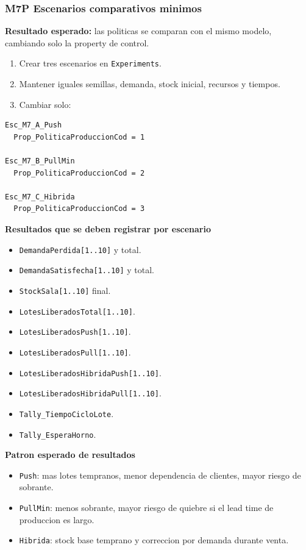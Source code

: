 \documentclass[11pt]{article}
\newcommand{\simio}[1]{\texttt{#1}}
\newcommand{\state}[1]{\texttt{#1}}
\begin{document}
\subsubsection{M7P Escenarios comparativos minimos}
\textbf{Resultado esperado:} las politicas se comparan con el mismo modelo, cambiando solo la property de control.

\begin{enumerate}
  \item Crear tres escenarios en \simio{Experiments}.
  \item Mantener iguales semillas, demanda, stock inicial, recursos y tiempos.
  \item Cambiar solo:
\end{enumerate}

\begin{lstlisting}[caption={Controles de escenarios M7}]
Esc_M7_A_Push
  Prop_PoliticaProduccionCod = 1

Esc_M7_B_PullMin
  Prop_PoliticaProduccionCod = 2

Esc_M7_C_Hibrida
  Prop_PoliticaProduccionCod = 3
\end{lstlisting}

\textbf{Resultados que se deben registrar por escenario}
\begin{itemize}
  \item \state{DemandaPerdida[1..10]} y total.
  \item \state{DemandaSatisfecha[1..10]} y total.
  \item \state{StockSala[1..10]} final.
  \item \state{LotesLiberadosTotal[1..10]}.
  \item \state{LotesLiberadosPush[1..10]}.
  \item \state{LotesLiberadosPull[1..10]}.
  \item \state{LotesLiberadosHibridaPush[1..10]}.
  \item \state{LotesLiberadosHibridaPull[1..10]}.
  \item \simio{Tally\_TiempoCicloLote}.
  \item \simio{Tally\_EsperaHorno}.
\end{itemize}

\textbf{Patron esperado de resultados}
\begin{itemize}
  \item \simio{Push}: mas lotes tempranos, menor dependencia de clientes, mayor riesgo de sobrante.
  \item \simio{PullMin}: menos sobrante, mayor riesgo de quiebre si el lead time de produccion es largo.
  \item \simio{Hibrida}: stock base temprano y correccion por demanda durante venta.
\end{itemize}
\end{document}
